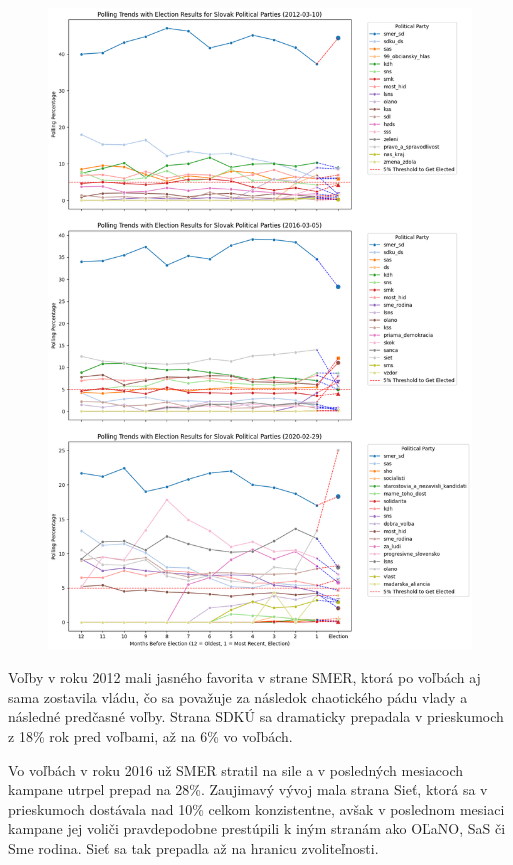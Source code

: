 \documentclass[report.tex]{subfiles}
\begin{document}
\begin{figure}[H]
    \centering
    \includegraphics[width=\textwidth]{images_exploratory/Polls_with_result_ALL.png}
    \caption{}
\end{figure}

\newpage

Voľby v roku 2012 mali jasného favorita v strane SMER, ktorá po voľbách aj sama zostavila vládu, čo sa považuje za následok chaotického pádu vlady a následné predčasné voľby. Strana SDKÚ sa dramaticky prepadala v prieskumoch z 18\% rok pred voľbami, až na 6\% vo voľbách. 

Vo voľbách v roku 2016 už SMER stratil na sile a v posledných mesiacoch kampane utrpel prepad na 28\%. Zaujimavý vývoj mala strana Sieť, ktorá sa v prieskumoch dostávala nad 10\% celkom konzistentne, avšak v poslednom mesiaci kampane jej voliči pravdepodobne prestúpili k iným stranám ako OĽaNO, SaS či Sme rodina. Sieť sa tak prepadla až na hranicu zvoliteľnosti.
\end{document}
